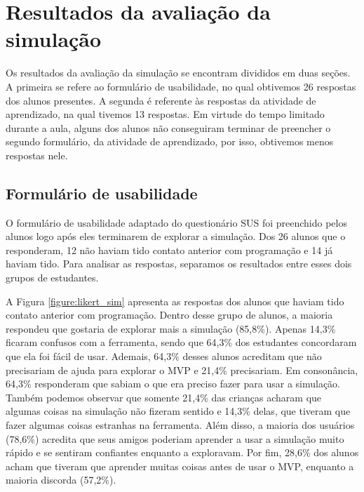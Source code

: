
\chapter{Resultados da avaliação da simulação}
\label{cap_resultados}

Os resultados da avaliação da simulação se encontram divididos em duas seções. A primeira se refere ao formulário de usabilidade, no qual obtivemos 26 respostas dos alunos presentes. A segunda é referente às respostas da atividade de aprendizado, na qual tivemos 13 respostas. Em virtude do tempo limitado durante a aula, alguns dos alunos não conseguiram terminar de preencher o segundo formulário, da atividade de aprendizado, por isso, obtivemos menos respostas nele.

\section{Formulário de usabilidade}

O formulário de usabilidade adaptado do questionário SUS foi preenchido pelos alunos logo após eles terminarem de explorar a simulação. Dos 26 alunos que o responderam, 12 não haviam tido contato anterior com programação e 14 já haviam tido. Para analisar as respostas, separamos os resultados entre esses dois grupos de estudantes.

A Figura \ref{figure:likert_sim} apresenta as respostas dos alunos que haviam tido contato anterior com programação. Dentro desse grupo de alunos, a maioria respondeu que gostaria de explorar mais a simulação (85,8\%). Apenas 14,3\% ficaram confusos com a ferramenta, sendo que 64,3\% dos estudantes concordaram que ela foi fácil de usar. Ademais, 64,3\% desses alunos acreditam que não precisariam de ajuda para explorar o MVP e 21,4\% precisariam. Em consonância, 64,3\% responderam que sabiam o que era preciso fazer para usar a simulação. Também podemos observar que somente 21,4\% das crianças acharam que algumas coisas na simulação não fizeram sentido e 14,3\% delas, que tiveram que fazer algumas coisas estranhas na ferramenta. Além disso, a maioria dos usuários (78,6\%) acredita que seus amigos poderiam aprender a usar a simulação muito rápido e se sentiram confiantes enquanto a exploravam. Por fim, 28,6\% dos alunos acham que tiveram que aprender muitas coisas antes de usar o MVP, enquanto a maioria discorda (57,2\%).

